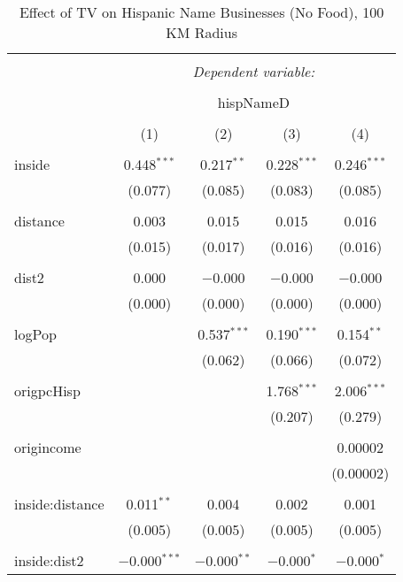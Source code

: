 
\begin{table}[!htbp] \centering 
  \caption{Effect of TV on Hispanic Name Businesses (No Food), 100 KM Radius} 
  \label{} 
\begin{tabular}{@{\extracolsep{-5pt}}lcccc} 
\\[-1.8ex]\hline 
\hline \\[-1.8ex] 
 & \multicolumn{4}{c}{\textit{Dependent variable:}} \\ 
\cline{2-5} 
\\[-1.8ex] & \multicolumn{4}{c}{hispNameD} \\ 
\\[-1.8ex] & (1) & (2) & (3) & (4)\\ 
\hline \\[-1.8ex] 
 inside & 0.448$^{***}$ & 0.217$^{**}$ & 0.228$^{***}$ & 0.246$^{***}$ \\ 
  & (0.077) & (0.085) & (0.083) & (0.085) \\ 
  & & & & \\ 
 distance & 0.003 & 0.015 & 0.015 & 0.016 \\ 
  & (0.015) & (0.017) & (0.016) & (0.016) \\ 
  & & & & \\ 
 dist2 & 0.000 & $-$0.000 & $-$0.000 & $-$0.000 \\ 
  & (0.000) & (0.000) & (0.000) & (0.000) \\ 
  & & & & \\ 
 logPop &  & 0.537$^{***}$ & 0.190$^{***}$ & 0.154$^{**}$ \\ 
  &  & (0.062) & (0.066) & (0.072) \\ 
  & & & & \\ 
 origpcHisp &  &  & 1.768$^{***}$ & 2.006$^{***}$ \\ 
  &  &  & (0.207) & (0.279) \\ 
  & & & & \\ 
 origincome &  &  &  & 0.00002 \\ 
  &  &  &  & (0.00002) \\ 
  & & & & \\ 
 inside:distance & 0.011$^{**}$ & 0.004 & 0.002 & 0.001 \\ 
  & (0.005) & (0.005) & (0.005) & (0.005) \\ 
  & & & & \\ 
 inside:dist2 & $-$0.000$^{***}$ & $-$0.000$^{**}$ & $-$0.000$^{*}$ & $-$0.000$^{*}$ \\ 

\end{tabular}
\end{table}
